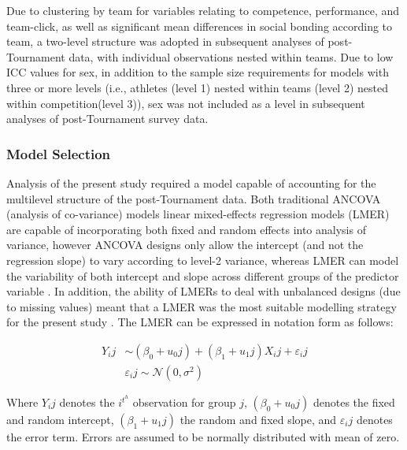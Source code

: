 Due to clustering by team for variables relating to competence, performance, and team-click, as well as significant mean differences in social bonding according to team, a two-level structure was adopted in subsequent analyses of post-Tournament data, with individual observations nested within teams. Due to low ICC values for sex, in addition to the sample size requirements for models with three or more levels (i.e., athletes (level 1) nested within teams (level 2) nested within competition(level 3)), sex was not included as a level in subsequent analyses of post-Tournament survey data.


\clearpage
\subsubsection{Model Selection}
Analysis of the present study required a model capable of accounting for the multilevel structure of the post-Tournament data.  Both traditional ANCOVA (analysis of co-variance) models linear mixed-effects regression models (LMER) are capable of incorporating both fixed and random effects into analysis of variance, however ANCOVA designs only allow the intercept (and not the regression slope) to vary according to level-2 variance, whereas LMER can model the variability of both intercept and slope across different groups of the predictor variable \citep{Field2012}. In addition, the ability of LMERs to deal with unbalanced designs (due to missing values) meant that a LMER was the most suitable modelling strategy for the present study \citep{Quene2004}.  The LMER can be expressed in notation form as follows:

  \begin{equation}
    \begin{align*}
      Y_ij & \sim  (\beta_0 + u_0j) + (\beta_1 + u_1j)X_ij + \varepsilon_ij\\
           & \varepsilon_ij \sim \mathcal{N}(0,\sigma^{2})
    \end{align*}
  \end{equation}


\bigskip
Where $Y_ij$ denotes the $i^t^h$ observation for group $j$, $(\beta_0 + u_0j)$ denotes the fixed and random intercept, $(\beta_1 + u_1j)$ the random and fixed slope, and $\varepsilon_ij$ denotes the error term.  Errors are assumed to be normally distributed with mean of zero.




